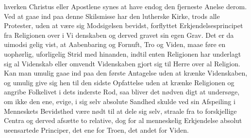 \documentclass[12pt,a4paper]{article}
\begin{document}
hverken Christus eller Apostlene synes at have endog den fjerneste
Anelse derom. Ved at gaae ind paa denne Skilsmisse har den
lutherske Kirke, trods alle Protester, uden at være sig Modsigelsen
bevidst, forflyttet Erkjendelsesprincipet fra Religionen over i Vi\-%
denskaben og derved gravet sin egen Grav. Det er da uimodsi\-%
gelig vist, at Aabenbaring og Fornuft, Tro og Viden, maae føre en
uophørlig, uforligelig Strid med hinanden, indtil enten Religionen
har underlagt sig al Videnskab eller omvendt Videnskaben gjort
sig til Herre over al Religion. Kan man umulig gaae ind
paa den første Antagelse uden at krænke Videnskaben, og umulig
give sig hen til den sidste Opfattelse uden at krænke Religionen
og angribe Folkelivet i dets inderste Rod, saa bliver det nødven\-%
digt at undersøge, om ikke den ene, evige, i sig selv absolute
Sandhed skulde ved sin Afspeiling i Menneskets Bevidsthed
være nødt til at dele sig selv, straale fra to forskjellige Centra
og derved afsætte to relative, dog for al menneskelig Erkjendelse
absolut ueensartede Principer, det ene for Troen, det andet
for Viden.
\end{document}
